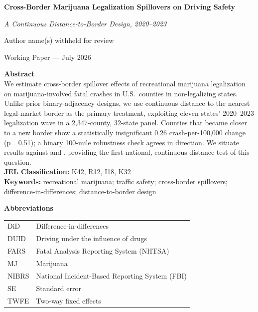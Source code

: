 \documentclass[11pt]{article}
\title{}
\author{}
\date{}
\begin{document}
\begin{titlepage}
\begin{center}
\vspace*{1.5cm}
{\LARGE \bfseries Cross-Border Marijuana Legalization Spillovers on Driving Safety\par}
\vspace{0.3cm}
{\large \itshape A Continuous Distance-to-Border Design, 2020--2023\par}
\vspace{1.2cm}
{\large Author name(s) withheld for review\par}
\vspace{0.3cm}
{\normalsize Working Paper --- July 2026\par}
\end{center}

\vspace{1.2cm}
\noindent\textbf{Abstract} \\[4pt]
\noindent We estimate cross-border spillover effects of recreational marijuana
legalization on marijuana-involved fatal crashes in U.S.\ counties in
non-legalizing states. Unlike prior binary-adjacency designs, we use
continuous distance to the nearest legal-market border as the primary
treatment, exploiting eleven states' 2020--2023 legalization wave in a
2,347-county, 32-state panel. Counties that became closer to a new
border show a statistically insignificant 0.26 crash-per-100,000
change (p\,=\,0.51); a binary 100-mile robustness check agrees in
direction. We situate results against \citet{HaoCowan2020} and
\citet{Moyer2026}, providing the first national, continuous-distance
test of this question. \\[10pt]
\noindent\textbf{JEL Classification:} K42, R12, I18, K32 \\
\noindent\textbf{Keywords:} recreational marijuana; traffic safety; cross-border spillovers; difference-in-differences; distance-to-border design

\vfill
\noindent\textbf{Abbreviations} \\[2pt]
\noindent
\begin{tabular}{@{}ll@{}}
DiD    & Difference-in-differences \\
DUID   & Driving under the influence of drugs \\
FARS   & Fatal Analysis Reporting System (NHTSA) \\
MJ     & Marijuana \\
NIBRS  & National Incident-Based Reporting System (FBI) \\
SE     & Standard error \\
TWFE   & Two-way fixed effects \\
\end{tabular}

\vspace{0.5cm}
\end{titlepage}
\end{document}
